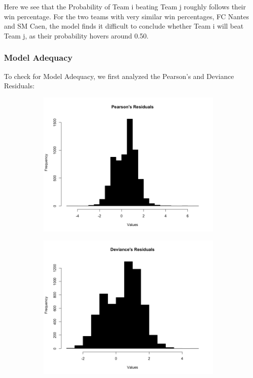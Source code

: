 \documentclass{article}
\begin{document}
Here we see that the Probability of Team i beating Team j roughly follows their win percentage. For the two teams with very similar win percentages, FC Nantes and SM Caen, the model finds it difficult to conclude whether Team i will beat Team j, as their probability hovers around 0.50.

\subsubsection{Model Adequacy}

To check for Model Adequacy, we first analyzed the Pearson's and Deviance Residuals:

\begin{figure}[H]
\centering
\begin{subfigure}{.5\textwidth}
  \centering
  \includegraphics[width=.8\linewidth]{figures/pearson.png}
  \label{fig:sub1}
\end{subfigure}%
\begin{subfigure}{.5\textwidth}
  \centering
  \includegraphics[width=.8\linewidth]{figures/deviance.png}
  \label{fig:sub2}
\end{subfigure}
\end{figure}
\end{document}
